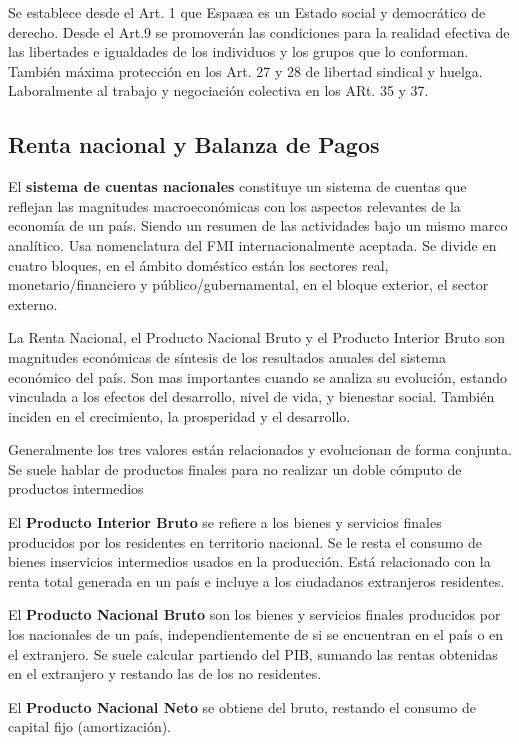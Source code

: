     Se establece desde el Art. 1 que Espaæa es un Estado social y democrático de derecho. Desde el Art.9 se promoverán las condiciones para la realidad efectiva de las libertades e igualdades de los individuos y los grupos que lo conforman. También máxima protección en los Art. 27 y 28 de libertad sindical y huelga. Laboralmente al trabajo y negociación colectiva en los ARt. 35 y 37.

\subsection{Renta nacional y Balanza de Pagos} %
    El \textbf{sistema de cuentas nacionales} constituye un sistema de cuentas que reflejan las magnitudes macroeconómicas con los aspectos relevantes de la economía de un país. Siendo un resumen de las actividades bajo un mismo marco analítico. Usa nomenclatura del FMI internacionalmente aceptada. Se divide en cuatro bloques, en el ámbito doméstico están los sectores real, monetario/financiero y público/gubernamental, en el bloque exterior, el sector externo.

    La Renta Nacional, el Producto Nacional Bruto y el Producto Interior Bruto son magnitudes económicas de síntesis de los resultados anuales del sistema económico del país. Son mas importantes cuando se analiza su evolución, estando vinculada a los efectos del desarrollo, nivel de vida, y bienestar social. También inciden en el crecimiento, la prosperidad y el desarrollo.

    Generalmente los tres valores están relacionados y evolucionan de forma conjunta. Se suele hablar de productos finales para no realizar un doble cómputo de productos intermedios
    
    El \textbf{Producto Interior Bruto} se refiere a los bienes y servicios finales producidos por los residentes en territorio nacional. Se le resta el consumo de bienes inservicios intermedios usados en la producción. Está relacionado con la renta total generada en un país e incluye a los ciudadanos extranjeros residentes.

    El \textbf{Producto Nacional Bruto} son los bienes y servicios finales producidos por los nacionales de un país, independientemente de si se encuentran en el país o en el extranjero. Se suele calcular partiendo del PIB, sumando las rentas obtenidas en el extranjero y restando las de los no residentes.

    El \textbf{Producto Nacional Neto} se obtiene del bruto, restando el consumo de capital fijo (amortización).

